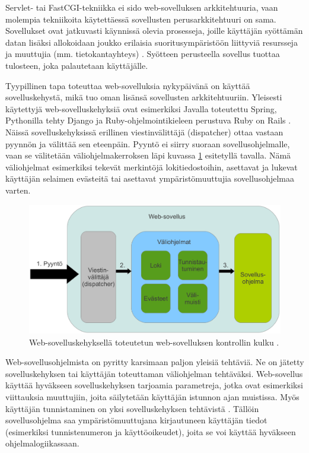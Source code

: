 Servlet- tai FastCGI-tekniikka ei sido web-sovelluksen arkkitehtuuria, vaan molempia tekniikoita käytettäessä sovellusten perusarkkitehtuuri on sama. Sovellukset ovat jatkuvasti käynnissä olevia prosesseja, joille käyttäjän syöttämän datan lisäksi allokoidaan joukko erilaisia suoritusympäristöön liittyviä resursseja ja muuttujia (mm. tietokantayhteys) \cite{uml}. Syötteen perusteella sovellus tuottaa tulosteen, joka palautetaan käyttäjälle.

Tyypillinen tapa toteuttaa web-sovelluksia nykypäivänä on käyttää sovelluskehystä, mikä tuo oman lisänsä sovellusten arkkitehtuuriin. Yleisesti käytettyjä web-sovelluskehyksiä ovat esimerkiksi Javalla toteutettu Spring, Pythonilla tehty Django ja Ruby-ohjelmointikieleen perustuva Ruby on Rails \cite{spring, django, ruby2011agile}. Näissä sovelluskehyksissä erillinen viestinvälittäjä (dispatcher) ottaa vastaan pyynnön ja välittää sen eteenpäin. Pyyntö ei siirry suoraan sovellusohjelmalle, vaan se välitetään väliohjelmakerroksen läpi kuvassa \ref{dispatcher} esitetyllä tavalla. Nämä väliohjelmat esimerkiksi tekevät merkintöjä lokitiedostoihin, asettavat ja lukevat käyttäjän selaimen evästeitä tai asettavat ympäristömuuttujia sovellusohjelmaa varten.

\begin{figure}[!b]
\centering
\includegraphics[width=\textwidth]{web/dispatcher.eps}
\caption{Web-sovelluskehyksellä toteutetun web-sovelluksen kontrollin kulku \cite{ruby2011agile}.}%
\label{dispatcher}
\end{figure}

Web-sovellusohjelmista on pyritty karsimaan paljon yleisiä tehtäviä. Ne on jätetty sovelluskehyksen tai käyttäjän toteuttaman väliohjelman tehtäväksi. Web-sovellus käyttää hyväkseen sovelluskehyksen tarjoamia parametreja, jotka ovat esimerkiksi viittauksia muuttujiin, joita säilytetään käyttäjän istunnon ajan muistissa. Myös käyttäjän tunnistaminen on yksi sovelluskehyksen tehtävistä \cite{ruby2011agile}. Tällöin sovellusohjelma saa ympäristömuuttujana kirjautuneen käyttäjän tiedot (esimerkiksi tunnistenumeron ja käyttöoikeudet), joita se voi käyttää hyväkseen ohjelmalogiikassaan.